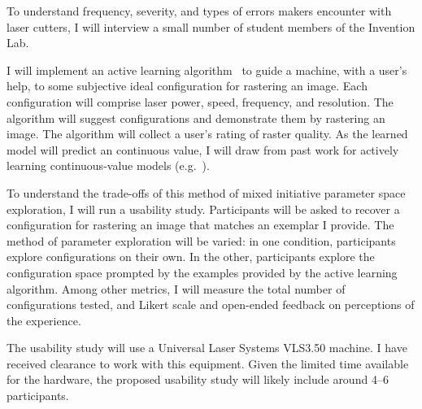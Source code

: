 To understand frequency, severity, and types of errors makers encounter with laser cutters, I will interview a small number of student members of the Invention Lab.

I will implement an active learning algorithm~\cite{settles_active_2010} to guide a machine, with a user's help, to some subjective ideal configuration for rastering an image.
Each configuration will comprise laser power, speed, frequency, and resolution.
The algorithm will suggest configurations and demonstrate them by rastering an image.
The algorithm will collect a user's rating of raster quality.
As the learned model will predict an continuous value, I will draw from past work for actively learning continuous-value models (e.g.~\cite{sugiyama_active_2008}).

To understand the trade-offs of this method of mixed initiative parameter space exploration, I will run a usability study.
Participants will be asked to recover a configuration for rastering an image that matches an exemplar I provide.
The method of parameter exploration will be varied:
in one condition, participants explore configurations on their own.
In the other, participants explore the configuration space prompted by the examples provided by the active learning algorithm.
Among other metrics, I will measure the total number of configurations tested, and Likert scale and open-ended feedback on perceptions of the experience.

The usability study will use a Universal Laser Systems VLS3.50 machine.
I have received clearance to work with this equipment.
Given the limited time available for the hardware, the proposed usability study will likely include around 4--6 participants.
